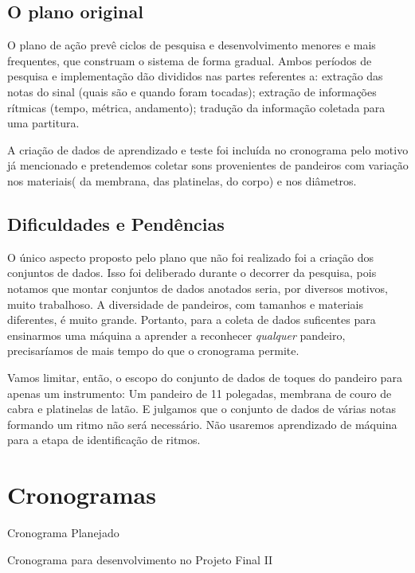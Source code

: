 \documentclass[
  dissertacao,
  brazil
]{ThesisPUC}
\begin{document}
\section{O plano original}
O plano de ação prevê ciclos de pesquisa e desenvolvimento menores e mais frequentes, que construam o sistema de forma gradual.
Ambos períodos de pesquisa e implementação dão divididos nas partes referentes a: extração das notas do sinal (quais são e quando foram tocadas); extração de informações rítmicas (tempo, métrica, andamento); tradução da informação coletada para uma partitura.

A criação de dados de aprendizado e teste foi incluída no cronograma pelo motivo já mencionado e pretendemos coletar sons provenientes de pandeiros com variação nos materiais( da membrana, das platinelas, do corpo) e nos diâmetros.


\section{Dificuldades e Pendências}

O único aspecto proposto pelo plano que não foi realizado foi a criação dos conjuntos de dados.
Isso foi deliberado durante o decorrer da pesquisa, pois notamos que montar conjuntos de dados anotados seria, por diversos motivos, muito trabalhoso.
A diversidade de pandeiros, com tamanhos e materiais diferentes, é muito grande. 
Portanto, para a coleta de dados suficentes para ensinarmos uma máquina a aprender a reconhecer \emph{qualquer} pandeiro, precisaríamos de mais tempo do que o cronograma permite. 

Vamos limitar, então, o escopo do conjunto de dados de toques do pandeiro para apenas um instrumento: Um pandeiro de 11 polegadas, membrana de couro de cabra e platinelas de latão.
E julgamos que o conjunto de dados de várias notas formando um ritmo não será necessário. Não usaremos aprendizado de máquina para a etapa de identificação de ritmos.


\chapter{Cronogramas}

\caption{Cronograma Planejado}

\caption{Cronograma para desenvolvimento no Projeto Final II}

\arial

\normalfont
\end{document}
